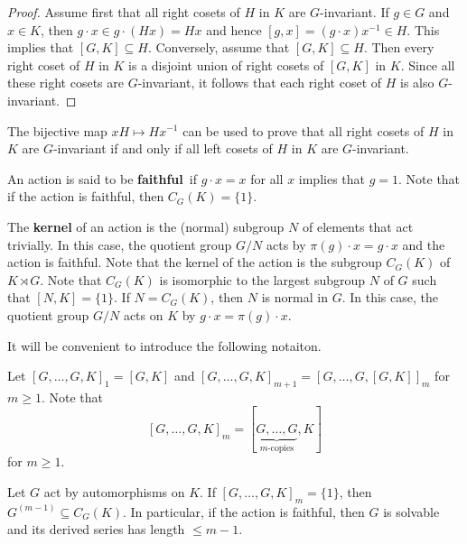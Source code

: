 \begin{proof}
	Assume first that all right cosets of $H$ in $K$ are $G$-invariant. If $g\in G$ and $x\in K$, then
	$g\cdot x\in g\cdot (Hx)=Hx$ and hence $[g,x]=(g\cdot x)x^{-1}\in H$. This implies that $[G,K]\subseteq H$. 
	Conversely, assume that $[G,K]\subseteq H$. Then every right coset of $H$ in $K$ 
	is a disjoint union of right cosets of $[G,K]$ in $K$. 
	Since all these right cosets are $G$-invariant, it follows
	that each right coset of $H$ is also $G$-invariant. 	 
\end{proof}

The bijective map $xH\mapsto Hx^{-1}$ can be used to prove that all right cosets 
of $H$ in $K$ are $G$-invariant if and only if all left cosets of $H$ in $K$ are $G$-invariant. 

An action is said to be \textbf{faithful} if $g\cdot x=x$ for all $x$ implies that $g=1$. 
Note that if the action is faithful, then $C_G(K)=\{1\}$. 

The \textbf{kernel}
of an action is the (normal) subgroup $N$ of elements that act trivially. In this case, the quotient group
$G/N$ acts by $\pi(g)\cdot x=g\cdot x$ and the action is faithful. Note that
the kernel of the action 
is the subgroup $C_G(K)$ of $K\rtimes G$. Note that $C_G(K)$ is isomorphic to 
the largest subgroup $N$ of $G$ such that $[N,K]=\{1\}$. If $N=C_G(K)$, then $N$ is normal in $G$. In this case,
the quotient group $G/N$ acts on $K$ by $g\cdot x=\pi(g)\cdot x$. 

It will be convenient to introduce the following notaiton. 

Let 
$[G,\dots,G,K]_1 = [G,K]$ and $[G,\dots,G,K]_{m+1}=[G,\dots,G,[G,K]]_m$ for $m\geq 1$. Note that 
\[
[G,\dots,G,K]_{m}=[\underbrace{G,\dots,G}_{\text{$m$-copies}},K]
\] 
for $m\geq 1$.

\begin{theorem}
Let $G$ act by automorphisms on $K$. If $[G,\dots,G,K]_m=\{1\}$, then
$G^{(m-1)}\subseteq  C_G(K)$. In particular, if the action is faithful, 
then $G$ is solvable 
and its derived series has length $\leq m-1$.
\end{theorem}

